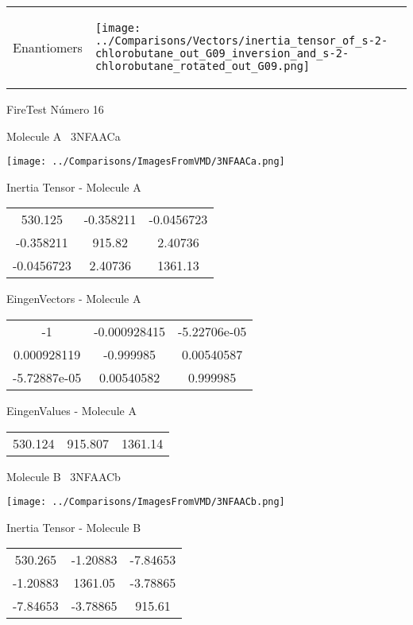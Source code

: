\vtab[-5mm]
\begin{tabular}{*{2}{m{}}}
\begin{center}
\textcolor{NavyBlue}{\Large Enantiomers}
\end{center}
&
\begin{center}
\texttt{[image: ../Comparisons/Vectors/inertia\_tensor\_of\_s-2-chlorobutane\_out\_G09\_inversion\_and\_s-2-chlorobutane\_rotated\_out\_G09.png]}
\end{center}
\end{tabular}

 \newpage

\vtab[-3cm]
\begin{center}
{\large FireTest \tab Número 16}
\end{center}
\begin{multicols}{2}
\begin{center}

Molecule A \
3NFAACa

\texttt{[image: ../Comparisons/ImagesFromVMD/3NFAACa.png]}

Inertia Tensor - Molecule A \\
\begin{tabular}{|c c c|}
530.125	 & 	-0.358211	 & 	-0.0456723	 \\
-0.358211	 & 	915.82	 & 	2.40736	 \\
-0.0456723	 & 	2.40736	 & 	1361.13
\end{tabular}

\vtab
 EingenVectors - Molecule A     \\
\begin{tabular}{|c c c|}
-1	 & 	-0.000928415	 & 	-5.22706e-05	 \\
0.000928119	 & 	-0.999985	 & 	0.00540587	 \\
-5.72887e-05	 & 	0.00540582	 & 	0.999985
\end{tabular}

\vtab
 EingenValues - Molecule A     \\
\begin{tabular}{|c c c|}
530.124	 & 	915.807	 & 	1361.14	 \\
\end{tabular}
\columnbreak

Molecule B \
3NFAACb

\texttt{[image: ../Comparisons/ImagesFromVMD/3NFAACb.png]}

Inertia Tensor - Molecule B \\
\begin{tabular}{|c c c|}
530.265	 & 	-1.20883	 & 	-7.84653	 \\
-1.20883	 & 	1361.05	 & 	-3.78865	 \\
-7.84653	 & 	-3.78865	 & 	915.61
\end{tabular}


\end{center}
\end{multicols}
